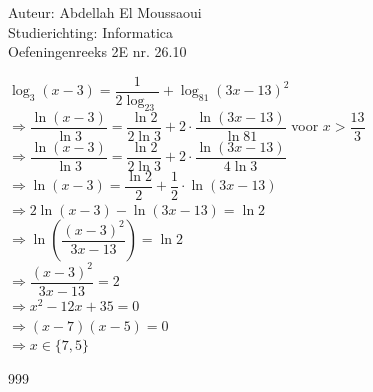 \documentclass[a4paper]{article}
\begin{document}
  
\noindent \large Auteur: Abdellah El Moussaoui \\
\noindent \large Studierichting: Informatica\\
\noindent \large Oefeningenreeks 2E nr. 26.10\\

\medskip

\normalsize

$\log_3\left(x-3\right)=\dfrac{1}{2\log_23}+\log_{81}\left(3x-13\right)^2$\\

$\Rightarrow \dfrac{\ln{\left(x-3\right)}}{\ln3}=\dfrac{\ln2}{2\ln3}+2 \cdot \dfrac{\ln{\left(3x-13\right)}}{\ln81}$ voor $x > \dfrac{13}{3}$\\

$\Rightarrow \dfrac{\ln{\left(x-3\right)}}{\ln3}=\dfrac{\ln2}{2\ln3}+2 \cdot \dfrac{\ln{\left(3x-13\right)}}{4\ln3}$\\

$\Rightarrow \ln{\left(x-3\right)}=\dfrac{\ln2}{2}+\dfrac{1}{2} \cdot \ln{\left(3x-13\right)}$\\

$\Rightarrow 2\ln{\left(x-3\right)} - \ln{\left(3x-13\right)}=\ln2$\\

$\Rightarrow \ln{\left(\dfrac{\left(x-3\right)^2}{3x-13}\right)}=\ln2$\\

$\Rightarrow \dfrac{\left(x-3\right)^2}{3x-13} = 2$\\

$\Rightarrow x^2-12x+35 = 0$\\

$\Rightarrow \left(x-7\right)\left(x-5\right)=0$\\

$\Rightarrow \boxed{x \in \{7,5\}}$\\



\begin{thebibliography}{999}
\end{thebibliography}
\end{document}

